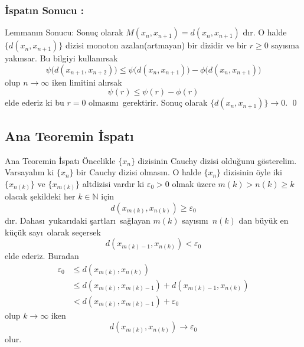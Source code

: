 \documentclass[8pt]{beamer}
\begin{document}
\subsubsection{ \.{I}spat\i n Sonucu :} 
\begin{frame} 
  \begin{block}{Lemman\i n Sonucu:}
Sonu\c{c} olarak  $M(x_{n},x_{n+1})= d(x_n,x_{n+1})$ d\i r. O halde $\{d(x_n,x_{n+1})\}$ dizisi monoton azalan(artmayan) bir dizidir ve bir $r\geq 0$ say\i s\i na yak\i nsar. Bu bilgiyi kullan\i rsak $$\psi\big(d(x_{n+1},x_{n+2})\big)\leq \psi\big(d(x_{n},x_{n+1})\big)-\phi\big(d(x_{n},x_{n+1})\big)$$ olup $n\to \infty$ iken limitini al\i rsak $$\psi(r)\leq \psi(r)-\phi(r)$$ elde ederiz ki bu $r=0$ olmas\i n\i\ gerektirir. Sonu\c{c} olarak $\{d(x_n,x_{n+1})\}\to 0$. \qed
   \end{block}
\end{frame}%



\subsection{Ana Teoremin \.{I}spat\i }
\begin{frame}
  \begin{block}{Ana Teoremin \.{I}spat\i }
    \"{O}ncelikle $\{x_n\}$ dizisinin Cauchy dizisi oldu\u{g}unu g\"osterelim. Varsayal\i m ki $\{x_n\}$ bir Cauchy dizisi olmas\i n. O halde $\{x_n\}$ dizisinin \"oyle iki $\{x_{n(k)}\}$ ve $\{x_{m(k)}\}$ altdizisi vard\i r ki $\varepsilon_0 > 0$ olmak \"uzere $m(k)>n(k)\geq k$ olacak \c{s}ekildeki her $k\in \mathbb{N}$ i\c{c}in $$d(x_{m(k)},x_{n(k)})\geq \varepsilon_0$$ d\i r. Dahas\i\ yukar\i daki \c{s}artlar\i\ sa\u{g}layan $m(k)$ say\i s\i n\i\ $n(k)$ dan b\"uy\"uk en k\"u\c{c}\"uk say\i\ olarak se\c{c}ersek $$d(x_{m(k)-1},x_{n(k)})<\varepsilon_0$$ elde ederiz. Buradan
    \begin{align}
      \varepsilon_0 &\leq d(x_{m(k)},x_{n(k)})\\
      &\leq d(x_{m(k)},x_{m(k)-1})+d(x_{m(k)-1},x_{n(k)})\\
      & <d(x_{m(k)},x_{m(k)-1})+\varepsilon_0
    \end{align}
olup $k\to \infty$ iken
    \begin{equation}
      d(x_{m(k)},x_{n(k)})\to \varepsilon_0
    \end{equation}
olur.
\end{block}
\end{frame}
\end{document}
